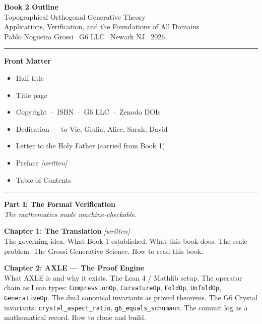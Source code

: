 \documentclass[12pt, oneside]{book}
\begin{document}
\thispagestyle{empty}

\begin{center}
{\LARGE\bfseries Book 2 Outline}\\[0.5em]
{\large Topographical Orthogonal Generative Theory}\\[0.3em]
{\large Applications, Verification, and the Foundations of All Domains}\\[1em]
{\normalsize Pablo Nogueira Grossi \textperiodcentered\ G6 LLC
\textperiodcentered\ Newark NJ \textperiodcentered\ 2026}
\end{center}

\vspace{0.5cm}
\hrule
\vspace{0.5cm}


\noindent\textbf{Front Matter}
\begin{itemize}[leftmargin=2em]
\item Half title
\item Title page
\item Copyright · ISBN · G6 LLC · Zenodo DOIs
\item Dedication --- to Vic, Giulia, Alice, Sarah, David
\item Letter to the Holy Father (carried from Book 1)
\item Preface \textit{[written]}
\item Table of Contents
\end{itemize}

\vspace{0.5cm}
\hrule
\vspace{0.5cm}


\noindent\textbf{Part I: The Formal Verification}\\
\textit{The mathematics made machine-checkable.}

\medskip
\noindent\textbf{Chapter 1: The Translation} \textit{[written]}\\
The governing idea. What Book 1 established. What this book does.
The scale problem. The Grossi Generative Science. How to read this book.

\medskip
\noindent\textbf{Chapter 2: AXLE --- The Proof Engine}\\
What AXLE is and why it exists. The Lean 4 / Mathlib setup.
The operator chain as Lean types: \texttt{CompressionOp},
\texttt{CurvatureOp}, \texttt{FoldOp}, \texttt{UnfoldOp},
\texttt{GenerativeOp}. The dm3 canonical invariants as proved
theorems. The G6 Crystal invariants: \texttt{crystal\_aspect\_ratio},
\texttt{g6\_equals\_schumann}. The commit log as a mathematical
record. How to clone and build.
\end{document}
